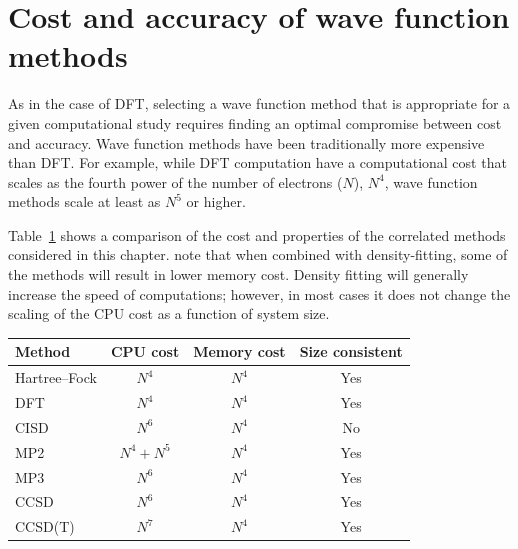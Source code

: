 \documentclass[../Main/notes.tex]{subfiles}
\begin{document}
\section{Cost and accuracy of wave function methods}

As in the case of DFT, selecting a wave function method that is appropriate for a given computational study requires finding an optimal compromise between cost and accuracy.
Wave function methods have been traditionally more expensive than DFT.
For example, while DFT computation have a computational cost that scales as the fourth power of the number of electrons ($N$), $N^4$, wave function methods scale at least as $N^5$ or higher.

Table~\ref{tab:wfn:comparison} shows a comparison of the cost and properties of the correlated methods considered in this chapter.
note that when combined with density-fitting, some of the methods will result in lower memory cost.
Density fitting will generally increase the speed of computations; however, in most cases it does not change the scaling of the CPU cost as a function of system size.
\begin{table}[htbp]
\centering
{} %
\begin{tabular}{@{} lccc @{}}
\toprule
Method & CPU cost & Memory cost & Size consistent\\
\midrule
Hartree--Fock & $N^4$ &  $N^4$ & Yes \\
DFT & $N^4$ & $N^4$ & Yes \\
CISD & $N^6$ & $N^4$ & No\\
MP2 & $N^4 + N^5$ & $N^4$ & Yes\\
MP3 & $N^6$ & $N^4$ & Yes \\
CCSD & $N^6$ &$ N^4$ & Yes\\
CCSD(T) & $N^7$ & $N^4$ &Yes\\
\bottomrule
\end{tabular}
\label{tab:wfn:comparison}
\end{table}
\end{document}
